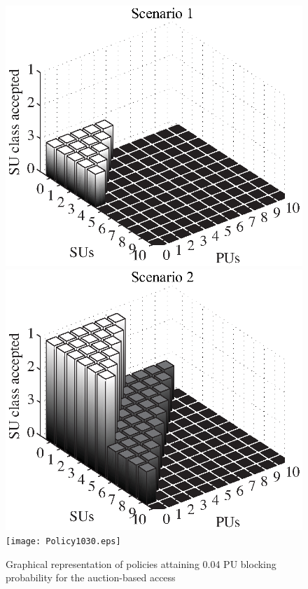 \begin{figure}[h]
\centering
\includegraphics[scale=0.5]{Policy3010.eps}
\includegraphics[scale=0.5]{Policy2020.eps}\\
\texttt{[image: Policy1030.eps]}
\caption[]{Graphical representation of policies attaining 0.04 PU blocking probability for the auction-based access}\label{fig:Policies}
\end{figure}

